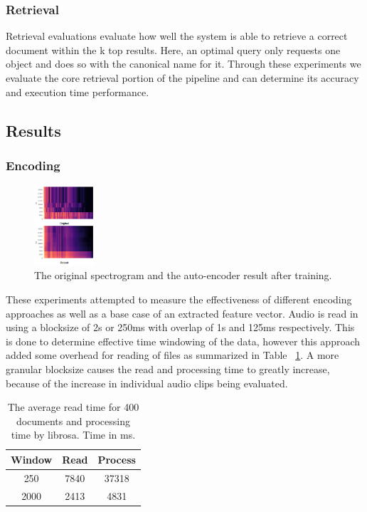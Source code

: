 \subsubsection{Retrieval}
Retrieval evaluations evaluate how well the system is able to retrieve a correct document within the k top results. Here, an optimal query only requests one object and does so with the canonical name for it. Through these experiments we evaluate the core retrieval portion of the pipeline and can determine its accuracy and execution time performance.

\subsection{Results}

\subsubsection{Encoding}

\begin{figure}
    \vspace{-17pt}
    \begin{center}
        \includegraphics[width=0.2\textwidth]{figures/autoencoded.png}
    \end{center}
    \caption{The original spectrogram and the auto-encoder result after training.}
    \label{fig:encode}
\end{figure}

These experiments attempted to measure the effectiveness of different encoding approaches as well as a base case of an extracted feature vector. Audio is read in using a blocksize of 2s or 250ms with overlap of 1s and 125ms respectively. This is done to determine effective time windowing of the data, however this approach added some overhead for reading of files as summarized in Table ~\ref{tab:base-time}. A more granular blocksize causes the read and processing time to greatly increase, because of the increase in individual audio clips being evaluated.

\begin{table}[h]
    \centering
    \begin{tabular}{c|cc}
    \textbf{Window} & \textbf{Read} & \textbf{Process} \\ \hline
    250              & 7840           & 37318                    \\
    2000             & 2413           & 4831                   
    \end{tabular}
    \caption{The average read time for 400 documents and processing time by librosa. Time in ms.}
    \label{tab:base-time}
\end{table}

